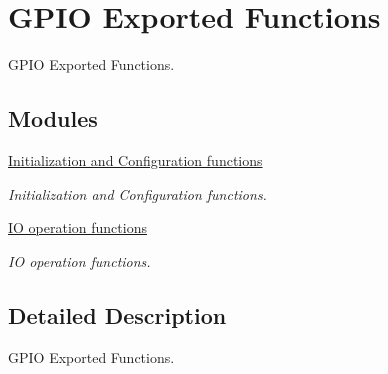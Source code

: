 \hypertarget{group___g_p_i_o___exported___functions}{\section{G\-P\-I\-O Exported Functions}
\label{group___g_p_i_o___exported___functions}
}


G\-P\-I\-O Exported Functions.  


\subsection*{Modules}
\begin{DoxyCompactItemize}
\item 
\hyperlink{group___g_p_i_o___exported___functions___group1}{Initialization and Configuration functions}
\begin{DoxyCompactList}\small\item\em Initialization and Configuration functions. \end{DoxyCompactList}\item 
\hyperlink{group___g_p_i_o___exported___functions___group2}{I\-O operation functions}
\begin{DoxyCompactList}\small\item\em I\-O operation functions. \end{DoxyCompactList}\end{DoxyCompactItemize}


\subsection{Detailed Description}
G\-P\-I\-O Exported Functions. 